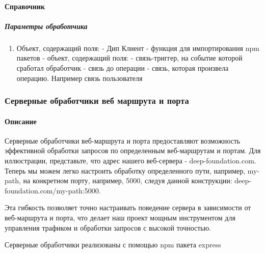 \documentclass{article}
\begin{document}
\paragraph{Справочник}
\subparagraph{Параметры обработчика}
\begin{enumerate}
  \item Объект, содержащий поля:
         - Дип Клиент
         - функция для импортирования npm пакетов
         - объект, содержащий поля:
         - связь-триггер, на событие которой сработал
        обработчик
         - связь до операции
         - связь, которая произвела операцию.
        Например связь пользователя
\end{enumerate}
\subsubsection{Серверные обработчики веб маршрута и порта}
\paragraph{Описание}
Серверные обработчики веб-маршрута и порта предоставляют возможность
эффективной обработки запросов по определенным веб-маршрутам и портам. Для
иллюстрации, представьте, что адрес нашего веб-сервера - deep-foundation.com.
Теперь мы можем легко настроить обработку определенного пути, например,
my-path, на конкретном порту, например, 5000, следуя данной конструкции:
deep-foundation.com/my-path:5000.

Эта гибкость позволяет точно настраивать поведение сервера в зависимости от
веб-маршрута и порта, что делает наш проект мощным инструментом для управления
трафиком и обработки запросов с высокой точностью.

Серверные обработчики реализованы с помощью npm пакета express
\end{document}
